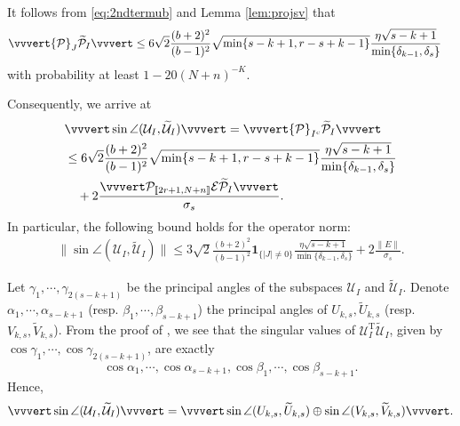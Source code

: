 \documentclass[reqno]{amsart}
\newcommand{\T}{\mathrm{T}}
\theoremstyle{plain}
\theoremstyle{definition}
\begin{document}
It follows from \eqref{eq:2ndtermub} and Lemma \ref{lem:projsv} that
\begin{align*}
&\vvvert {\mathcal P}_J  \widetilde{\mathcal P}_I \vvvert \le 6\sqrt{2} \frac{(b+2)^2}{(b-1)^2}\sqrt{\min\{s-k+1,r-s+k-1\}} \frac{ \eta\sqrt{s-k+1}}{\min\{\delta_{k-1}, \delta_s\}}
\end{align*}
with probability at least $1 - 20(N+n)^{-K}$.

Consequently, we arrive at 
\begin{align}\label{eq:conclude}
&\vvvert \sin \angle (\mathcal U_{I}, \widetilde{\mathcal U}_{I}) \vvvert =\vvvert {\mathcal P}_{I^c}  \widetilde{\mathcal P}_I \vvvert \nonumber\\
& \leq  6\sqrt{2} \frac{(b+2)^2}{(b-1)^2}\sqrt{\min\{s-k+1,r-s+k-1\}} \frac{ \eta\sqrt{s-k+1}}{\min\{\delta_{k-1}, \delta_s\}} \nonumber\\
&\quad + 2 \frac{ \vvvert \mathcal P_{\llbracket 2r+1, N+n\rrbracket} \mathcal E \widetilde{\mathcal P}_I\vvvert}{\sigma_{s} }.
\end{align}
In particular, the following bound holds for the operator norm:
\begin{align}\label{eq:conclude-op}
\| \sin \angle (\mathcal U_{I}, \widetilde{\mathcal U}_{I}) \| \le 3\sqrt{2} \frac{(b+2)^2}{(b-1)^2} \mathbf{1}_{\{|J| \neq 0 \}} \frac{ \eta\sqrt{s-k+1}}{\min\{\delta_{k-1}, \delta_s\}} + 2\frac{\|E\|}{\sigma_{s}}.
\end{align}

Let $\gamma_1,\cdots,\gamma_{2(s-k+1)}$ be the principal angles of  the subspaces $\mathcal U_{I}$ and $\widetilde{\mathcal U}_{I}$. Denote $\alpha_1,\cdots,\alpha_{s-k+1}$ (resp. $\beta_1,\cdots,\beta_{s-k+1}$) the principal angles of $ U_{k,s}, \widetilde{ U}_{k,s}$ (resp. $ V_{k,s}, \widetilde{ V}_{k,s}$). From the proof of \cite[Proposition 8]{OVW22}, we see that the singular values of $\mathcal U_{I}^\T \widetilde{\mathcal U}_{I}$, given by $\cos\gamma_1,\cdots,\cos\gamma_{2(s-k+1)}$, are exactly
$$\cos\alpha_1,\cdots,\cos\alpha_{s-k+1}, \cos\beta_1,\cdots,\cos\beta_{s-k+1}.$$
Hence, $$\vvvert \sin \angle (\mathcal U_{I}, \widetilde{\mathcal U}_{I}) \vvvert = \vvvert \sin \angle ( U_{k,s}, \widetilde{ U}_{k,s}) \oplus \sin \angle ( V_{k,s}, \widetilde{ V}_{k,s}) \vvvert.$$
\end{document}
